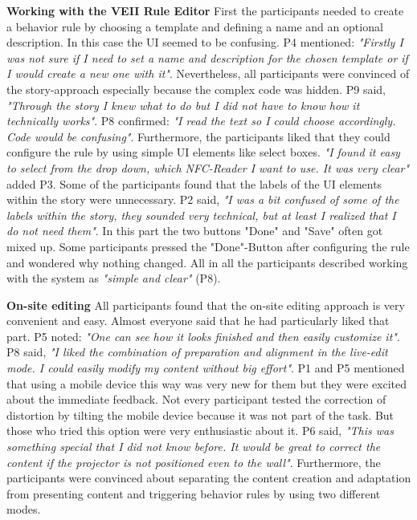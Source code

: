 \textbf{Working with the VEII Rule Editor}
\newline
First the participants needed to create a behavior rule by choosing a template and defining a name and an optional description. In this case the UI seemed to be confusing. P4 mentioned: \textit{"Firstly I was not sure if I need to set a name and description for the chosen template or if I would create a new one with it"}.
Nevertheless, all participants were convinced of the story-approach especially because the complex code was hidden. P9 said, \textit{"Through the story I knew what to do but I did not have to know how it technically works"}. P8 confirmed: \textit{"I read the text so I could choose accordingly. Code would be confusing"}. Furthermore, the participants liked that they could configure the rule by using simple UI elements like select boxes. \textit{"I found it easy to select from the drop down, which NFC-Reader I want to use. It was very clear"} added P3. Some of the participants found that the labels of the UI elements within the story were unnecessary. P2 said, \textit{"I was a bit confused of some of the labels within the story, they sounded very technical, but at least I realized that I do not need them"}. In this part the two buttons "Done" and "Save" often got mixed up. Some participants pressed the "Done"-Button after configuring the rule and wondered why nothing changed. All in all the participants described working with the system as \textit{"simple and clear"} (P8).
\newline

\textbf{On-site editing}
\newline
All participants found that the on-site editing approach is very convenient and easy. Almost everyone said that he had particularly liked that part. P5 noted: \textit{"One can see how it looks finished and then easily customize it"}. P8 said, \textit{"I liked the combination of preparation and alignment in the live-edit mode. I could easily modify my content without big effort"}. P1 and P5 mentioned that using a mobile device this way was very new for them but they were excited about the immediate feedback. 
Not every participant tested the correction of distortion by tilting the mobile device because it was not part of the task. But those who tried this option were very enthusiastic about it. P6 said, \textit{"This was something special that I did not know before. It would be great to correct the content if the projector is not positioned even to the wall"}. Furthermore, the participants were convinced about separating the content creation and adaptation from presenting content and triggering behavior rules by using two different modes.
\newline

